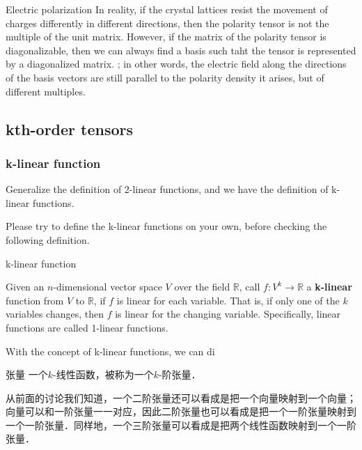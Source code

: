 \begin{example}{Electric polarization}
In reality, if the crystal lattices resist the movement of charges differently in different directions, then the polarity tensor is not the multiple of the unit matrix. However, if the matrix of the polarity tensor is diagonalizable, then we can always find a basis such taht the tensor is represented by a diagonalized matrix. ; in other words, the electric field along the directions of the basis vectors are still parallel to the polarity density it arises, but of different multiples. 

\end{example}


\subsection{kth-order tensors}

\subsubsection{k-linear function}

Generalize the definition of 2-linear functions, and we have the definition of k-linear functions. 

\begin{exercise}{}
Please try to define the k-linear functions on your own, before checking the following definition. 
\end{exercise}

\begin{definition}{k-linear function}

Given an $n$-dimensional vector space $V$ over the field $\mathbb{R}$, call $f:V^k\rightarrow \mathbb{R}$ a \textbf{k-linear} function from $V$ to $\mathbb{R}$, if $f$ is linear for each variable. That is, if only one of the $k$ variables changes, then $f$ is linear for the changing variable. Specifically, linear functions are called 1-linear functions. 
\end{definition}

With the concept of k-linear functions, we can di

\begin{definition}{张量}
一个$k$-线性函数，被称为一个$k$-阶张量．
\end{definition}

从前面的讨论我们知道，一个二阶张量还可以看成是把一个向量映射到一个向量；向量可以和一阶张量一一对应，因此二阶张量也可以看成是把一个一阶张量映射到一个一阶张量．同样地，一个三阶张量可以看成是把两个线性函数映射到一个一阶张量．

